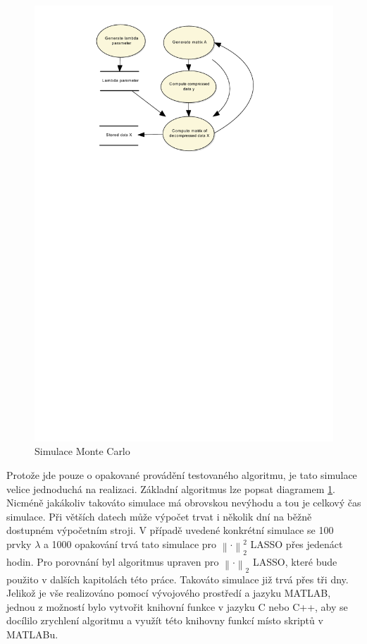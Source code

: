 \documentclass[FM,BP]{tulthesis}
\begin{document}
\begin{figure}[!ht]
	\begin{center}
		\includegraphics[scale=0.9]{obr/mcsim.pdf}
	\end{center}
	\caption{Simulace Monte Carlo}
	\label{fig:mcSim}
\end{figure}

Protože jde pouze o opakované provádění testovaného algoritmu, je tato simulace velice jednoduchá na realizaci. Základní algoritmus lze popsat diagramem \ref{fig:mcSim}. Nicméně jakákoliv takováto simulace má obrovskou nevýhodu a tou je celkový čas simulace. Při větších datech může výpočet trvat i několik dní na běžně dostupném výpočetním stroji. V případě uvedené konkrétní simulace se 100 prvky $\lambda$ a 1000 opakování trvá tato simulace pro $\left\| \cdot\right\|_{2}^{2} $ LASSO přes jedenáct hodin. Pro porovnání byl algoritmus upraven pro $\left\| \cdot \right\|_2 $ LASSO, které bude použito v dalších kapitolách této práce. Takováto simulace již trvá přes tři dny. Jelikož je vše realizováno pomocí vývojového prostředí a jazyku MATLAB, jednou z možností bylo vytvořit knihovní funkce v jazyku C nebo C++, aby se docílilo zrychlení algoritmu a využít této knihovny funkcí místo skriptů v MATLABu.  
\end{document}

